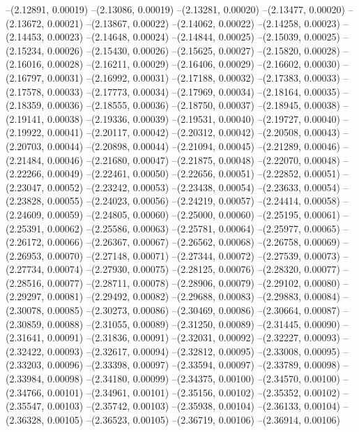 --(2.12891, 0.00019)
--(2.13086, 0.00019)
--(2.13281, 0.00020)
--(2.13477, 0.00020)
--(2.13672, 0.00021)
--(2.13867, 0.00022)
--(2.14062, 0.00022)
--(2.14258, 0.00023)
--(2.14453, 0.00023)
--(2.14648, 0.00024)
--(2.14844, 0.00025)
--(2.15039, 0.00025)
--(2.15234, 0.00026)
--(2.15430, 0.00026)
--(2.15625, 0.00027)
--(2.15820, 0.00028)
--(2.16016, 0.00028)
--(2.16211, 0.00029)
--(2.16406, 0.00029)
--(2.16602, 0.00030)
--(2.16797, 0.00031)
--(2.16992, 0.00031)
--(2.17188, 0.00032)
--(2.17383, 0.00033)
--(2.17578, 0.00033)
--(2.17773, 0.00034)
--(2.17969, 0.00034)
--(2.18164, 0.00035)
--(2.18359, 0.00036)
--(2.18555, 0.00036)
--(2.18750, 0.00037)
--(2.18945, 0.00038)
--(2.19141, 0.00038)
--(2.19336, 0.00039)
--(2.19531, 0.00040)
--(2.19727, 0.00040)
--(2.19922, 0.00041)
--(2.20117, 0.00042)
--(2.20312, 0.00042)
--(2.20508, 0.00043)
--(2.20703, 0.00044)
--(2.20898, 0.00044)
--(2.21094, 0.00045)
--(2.21289, 0.00046)
--(2.21484, 0.00046)
--(2.21680, 0.00047)
--(2.21875, 0.00048)
--(2.22070, 0.00048)
--(2.22266, 0.00049)
--(2.22461, 0.00050)
--(2.22656, 0.00051)
--(2.22852, 0.00051)
--(2.23047, 0.00052)
--(2.23242, 0.00053)
--(2.23438, 0.00054)
--(2.23633, 0.00054)
--(2.23828, 0.00055)
--(2.24023, 0.00056)
--(2.24219, 0.00057)
--(2.24414, 0.00058)
--(2.24609, 0.00059)
--(2.24805, 0.00060)
--(2.25000, 0.00060)
--(2.25195, 0.00061)
--(2.25391, 0.00062)
--(2.25586, 0.00063)
--(2.25781, 0.00064)
--(2.25977, 0.00065)
--(2.26172, 0.00066)
--(2.26367, 0.00067)
--(2.26562, 0.00068)
--(2.26758, 0.00069)
--(2.26953, 0.00070)
--(2.27148, 0.00071)
--(2.27344, 0.00072)
--(2.27539, 0.00073)
--(2.27734, 0.00074)
--(2.27930, 0.00075)
--(2.28125, 0.00076)
--(2.28320, 0.00077)
--(2.28516, 0.00077)
--(2.28711, 0.00078)
--(2.28906, 0.00079)
--(2.29102, 0.00080)
--(2.29297, 0.00081)
--(2.29492, 0.00082)
--(2.29688, 0.00083)
--(2.29883, 0.00084)
--(2.30078, 0.00085)
--(2.30273, 0.00086)
--(2.30469, 0.00086)
--(2.30664, 0.00087)
--(2.30859, 0.00088)
--(2.31055, 0.00089)
--(2.31250, 0.00089)
--(2.31445, 0.00090)
--(2.31641, 0.00091)
--(2.31836, 0.00091)
--(2.32031, 0.00092)
--(2.32227, 0.00093)
--(2.32422, 0.00093)
--(2.32617, 0.00094)
--(2.32812, 0.00095)
--(2.33008, 0.00095)
--(2.33203, 0.00096)
--(2.33398, 0.00097)
--(2.33594, 0.00097)
--(2.33789, 0.00098)
--(2.33984, 0.00098)
--(2.34180, 0.00099)
--(2.34375, 0.00100)
--(2.34570, 0.00100)
--(2.34766, 0.00101)
--(2.34961, 0.00101)
--(2.35156, 0.00102)
--(2.35352, 0.00102)
--(2.35547, 0.00103)
--(2.35742, 0.00103)
--(2.35938, 0.00104)
--(2.36133, 0.00104)
--(2.36328, 0.00105)
--(2.36523, 0.00105)
--(2.36719, 0.00106)
--(2.36914, 0.00106)
